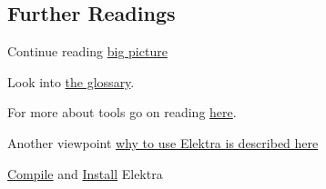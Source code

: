\subsection*{Further Readings}


\begin{DoxyItemize}
\item Continue reading \hyperlink{doc_BIGPICTURE_md}{big picture}
\item Look into \hyperlink{md_doc_help_elektra-glossary_doc_help_elektra-glossary_md}{the glossary}.
\item For more about tools go on reading \hyperlink{md_doc_help_kdb_doc_help_kdb_md}{here}.
\item Another viewpoint \hyperlink{md_doc_help_elektra-introduction_doc_help_elektra-introduction_md}{why to use Elektra is described here}
\item \hyperlink{doc_COMPILE_md}{Compile} and \hyperlink{doc_INSTALL_md}{Install} Elektra 
\end{DoxyItemize}